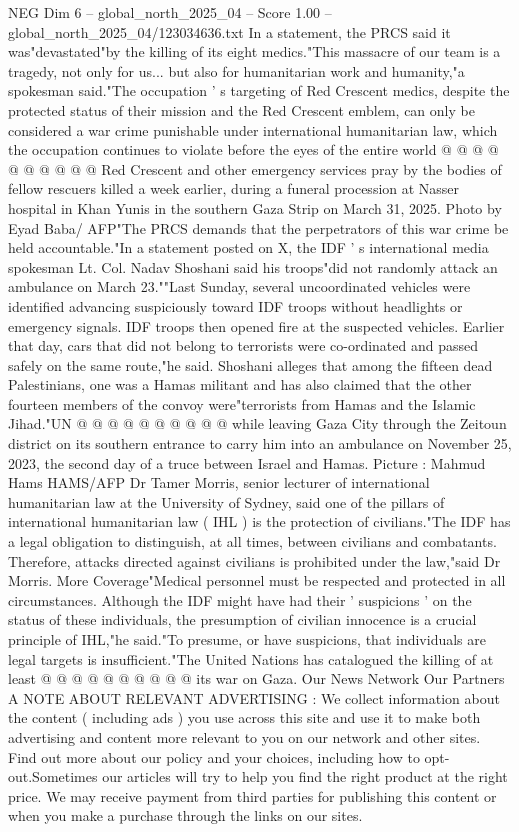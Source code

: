 \begin{textsample}{NEG Dim 6 – global\_north\_2025\_04 – Score 1.00 – global\_north\_2025\_04/123034636.txt}
In a statement, the PRCS said it was"devastated"by the killing of its eight medics."This massacre of our team is a tragedy, not only for us... but also for humanitarian work and humanity,"a spokesman said."The occupation ' s targeting of Red Crescent medics, despite the protected status of their mission and the Red Crescent emblem, can only be considered a war crime punishable under international humanitarian law, which the occupation continues to violate before the eyes of the entire world @ @ @ @ @ @ @ @ @ @ Red Crescent and other emergency services pray by the bodies of fellow rescuers killed a week earlier, during a funeral procession at Nasser hospital in Khan Yunis in the southern Gaza Strip on March 31, 2025.
Photo by Eyad Baba/ AFP"The PRCS demands that the perpetrators of this war crime be held accountable."In a statement posted on X, the IDF ' s international media spokesman Lt.
Col.
Nadav Shoshani said his troops"did not randomly attack an ambulance on March 23.""Last Sunday, several uncoordinated vehicles were identified advancing suspiciously toward IDF troops without headlights or emergency signals.
IDF troops then opened fire at the suspected vehicles.
Earlier that day, cars that did not belong to terrorists were co-ordinated and passed safely on the same route,"he said.
Shoshani alleges that among the fifteen dead Palestinians, one was a Hamas militant and has also claimed that the other fourteen members of the convoy were"terrorists from Hamas and the Islamic Jihad."UN @ @ @ @ @ @ @ @ @ @ while leaving Gaza City through the Zeitoun district on its southern entrance to carry him into an ambulance on November 25, 2023, the second day of a truce between Israel and Hamas.
Picture : Mahmud Hams HAMS/AFP Dr Tamer Morris, senior lecturer of international humanitarian law at the University of Sydney, said one of the pillars of international humanitarian law ( IHL ) is the protection of civilians."The IDF has a legal obligation to distinguish, at all times, between civilians and combatants.
Therefore, attacks directed against civilians is prohibited under the law,"said Dr Morris.
More Coverage"Medical personnel must be respected and protected in all circumstances.
Although the IDF might have had their ' suspicions ' on the status of these individuals, the presumption of civilian innocence is a crucial principle of IHL,"he said."To presume, or have suspicions, that individuals are legal targets is insufficient."The United Nations has catalogued the killing of at least @ @ @ @ @ @ @ @ @ @ its war on Gaza.
Our News Network Our Partners A NOTE ABOUT RELEVANT ADVERTISING : We collect information about the content ( including ads ) you use across this site and use it to make both advertising and content more relevant to you on our network and other sites.
Find out more about our policy and your choices, including how to opt-out.Sometimes our articles will try to help you find the right product at the right price.
We may receive payment from third parties for publishing this content or when you make a purchase through the links on our sites.

\end{textsample}
